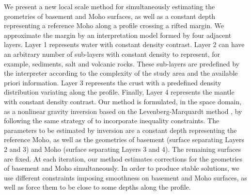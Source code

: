 \documentclass[manuscript]{geophysics}
\begin{document}
We present a new local scale method for simultaneously estimating the geometries
of basement and Moho surfaces, as well as a constant depth representing a reference Moho
along a profile crossing a rifted margin.
We approximate the margin by an interpretation model formed by four adjacent layers.
Layer 1 represents water with constant density contrast.
Layer 2 can have an arbitrary number of sub-layers with constant density
to represent, for example, sediments, salt and volcanic rocks.
These sub-layers are predefined by the interpreter according to
the complexity of the study area and the available priori information.
Layer 3 represents the crust with a predefined density distribution
variating along the profile.
Finally, Layer 4 represents the mantle with constant density contrast.
Our method is formulated, in the space domain, as a nonlinear gravity inversion
based on the Levenberg-Marquardt method \citep{silva-etal2001, aster-etal2005}, 
by following the same strategy of \citet{barbosa-etal1999} to incorporate
inequality constraints.
The parameters to be estimated by inversion are a constant depth representing the
reference Moho, as well as the geometries of 
basement (surface separating Layers 2 and 3) and Moho (surface separating Layers 3 and 4).
The remaining surfaces are fixed.
At each iteration, our method estimates corrections for the geometries of
basement and Moho simultaneously. 
In order to produce stable solutions,
we use different constraints imposing smoothness on basement and Moho surfaces, 
as well as force them to be close to some depths along the profile. 
\end{document}
